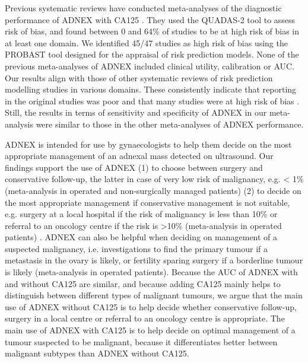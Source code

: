 Previous systematic reviews have conducted meta-analyses of the diagnostic
performance of \gls{ADNEX} with CA125
 \cite{cuiDiagnosticAccuraciesUltrasound2022,
  davenportMenopausalStatusUltrasound2022,
  huangDiagnosticAccuracyADNEX2021,westwoodRiskScoresGuide2018,
  yueValueAssessmentDifferent2022}.
They used the \gls{QUADAS}-2 tool \cite{whitingQUADAS2RevisedTool2011} to assess risk
of bias, and found between 0 and 64\% of studies to be at high risk of bias in
at least one domain. We identified 45/47 studies as high risk of bias using the
\gls{PROBAST} tool designed for the appraisal of risk prediction models. None of the
previous meta-analyses of \gls{ADNEX} included clinical utility, calibration or \gls{AUC}.
Our results align with those of other systematic reviews of risk prediction
modelling studies in various domains. These consistently indicate that reporting
in the original studies was poor and that many studies were at high risk of bias
 \cite{collinsExternalValidationMultivariable2014,
  wynantsPredictionModelsDiagnosis2020,
  helmrichDoesPoorMethodological2022,
  dhimanReportingPrognosticClinical2021,andaurnavarroRiskBiasStudies2021,
  alloteyExternalValidationPrognostic2022,
  bouwmeesterReportingMethodsClinical2012}.
Still, the results in terms of sensitivity and specificity of \gls{ADNEX} in our
meta-analysis were similar to those in the other meta-analyses of \gls{ADNEX}
performance.

\gls{ADNEX} is intended for use by gynaecologists to help them decide on the most
appropriate management of an adnexal mass detected on ultrasound. Our findings
support the use of \gls{ADNEX} (1) to choose between surgery and conservative
follow-up, the latter in case of very low risk of malignancy, e.g. < 1\%
(meta-analysis in operated and non-surgically managed patients) (2) to decide on
the most appropriate management if conservative management is not suitable, e.g.
surgery at a local hospital if the risk of malignancy is less than 10\% or
referral to an oncology centre if the risk is >10\% (meta-analysis in operated
patients) \cite{timmermanESGOISUOGIOTA2021}. \gls{ADNEX} can also be helpful when
deciding on management of a suspected malignancy, i.e. investigations to find
the primary tumour if a metastasis in the ovary is likely, or fertility sparing
surgery if a borderline tumour is likely (meta-analysis in operated patients).
Because the \gls{AUC} of \gls{ADNEX} with and without CA125 are similar, and because adding
CA125 mainly helps to distinguish between different types of malignant tumours,
we argue that the main use of \gls{ADNEX} without CA125 is to help decide whether
conservative follow-up, surgery in a local centre or referral to an oncology
centre is appropriate. The main use of \gls{ADNEX} with CA125 is to help decide on
optimal management of a tumour suspected to be malignant, because it
differentiates better between malignant subtypes than \gls{ADNEX} without CA125.

